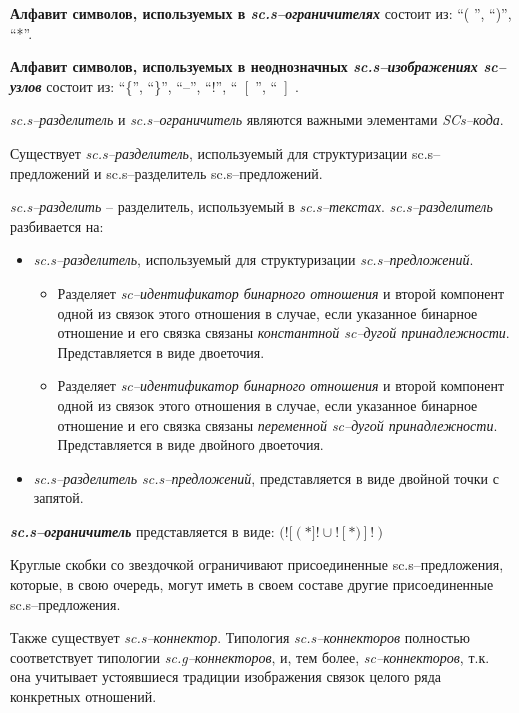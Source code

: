 \textbf{Алфавит символов, используемых в \textit{sc.s--ограничителях}} состоит из: ``( ''{}, ``)''{}, ``*''{}.

\textbf{Алфавит символов, используемых в неоднозначных \textit{sc.s--изображениях sc--узлов}} состоит из:
``\{''{}, ``\}''{}, 
``--''{}, ``!''{}, ``~[ \,''{}, ``~] \,{}.




\textit{sc.s--разделитель} и \textit{sc.s--ограничитель} являются важными элементами \textit{SCs--кода}.

Существует \textit{sc.s--разделитель}, используемый для структуризации sc.s--предложений и sc.s--разделитель sc.s--предложений.

\textit{sc.s--разделить} -- разделитель, используемый в \textit{sc.s--текстах}. \textit{sc.s--разделитель} разбивается на:
\begin{itemize}
	\item \textit{sc.s--разделитель}, используемый для структуризации \textit{\textit{sc.s--предложений}}.
	\begin{itemize}
		\item Разделяет \textit{sc--идентификатор бинарного отношения} и второй компонент одной из связок этого отношения в случае, если указанное бинарное отношение и его связка связаны \textit{константной sc--дугой принадлежности}. Представляется в виде двоеточия.

		\item Разделяет \textit{sc--идентификатор бинарного отношения} и второй компонент одной из связок этого отношения в случае, если указанное бинарное отношение и его связка связаны \textit{переменной sc--дугой принадлежности}. Представляется в виде двойного двоеточия.
		
	\end{itemize}
	\item  \textit{sc.s--разделитель \textit{sc.s--предложений}}, представляется в виде двойной точки с запятой.    
\end{itemize}



\bigskip
\textbf{\textit{sc.s--ограничитель}} представляется в виде: $(![  (\ast ]! \cup ![  \ast) ]!)$

Круглые скобки со звездочкой ограничивают присоединенные sc.s--предложения, которые, в свою очередь, могут иметь в своем составе другие присоединенные sc.s--предложения.

Также существует \textit{\textit{sc.s--коннектор}}. Типология \textit{\textit{sc.s--коннектор}ов} полностью соответствует типологии \textit{sc.g--коннекторов}, и, тем более, \textit{sc--коннекторов}, т.к. она учитывает устоявшиеся традиции изображения связок целого ряда конкретных отношений.

